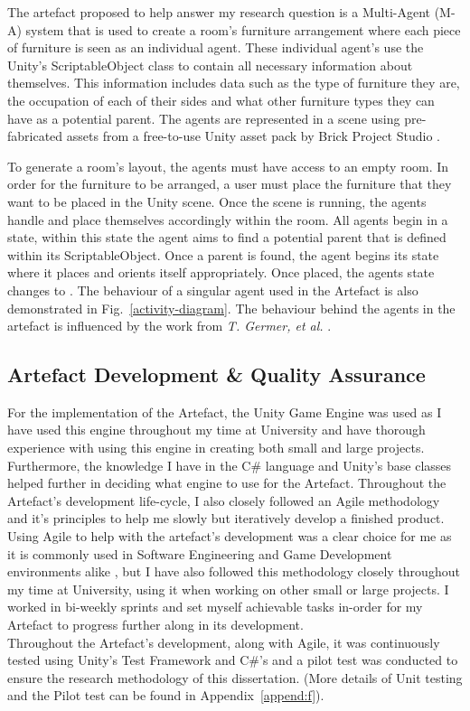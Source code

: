 The artefact proposed to help answer my research question is a Multi-Agent (M-A) system that is used to create a room's furniture arrangement where each piece of furniture is seen as an individual agent. These individual agent's use the Unity's \cite{unity} ScriptableObject class to contain all necessary information about themselves. This information includes data such as the type of furniture they are, the occupation of each of their sides and what other furniture types they can have as a potential parent. The agents are represented in a scene using pre-fabricated assets from a free-to-use Unity asset pack by Brick Project Studio \cite{brick-project}.

To generate a room's layout, the agents must have access to an empty room. In order for the furniture to be arranged, a user must place the furniture that they want to be placed in the Unity scene. Once the scene is running, the agents handle and place themselves accordingly within the room.
All agents begin in a  state, within this state the agent aims to find a potential parent that is defined within its ScriptableObject. Once a parent is found, the agent begins its  state where it places and orients itself appropriately. Once placed, the agents state changes to . The behaviour of a singular agent used in the Artefact is also demonstrated in Fig.~\ref{activity-diagram}.
The behaviour behind the agents in the artefact is influenced by the work from \textit{T. Germer, et al.} \cite{real-time-walkthroughs}.

\subsection{Artefact Development \& Quality Assurance} 
For the implementation of the Artefact, the Unity Game Engine \cite{unity} was used as I have used this engine throughout my time at University and have thorough experience with using this engine in creating both small and large projects. Furthermore, the knowledge I have in the C\# language and Unity's base classes helped further in deciding what engine to use for the Artefact.
Throughout the Artefact's development life-cycle, I also closely followed an Agile methodology and it's principles to help me slowly but iteratively develop a finished product. Using Agile to help with the artefact's development was a clear choice for me as it is commonly used in Software Engineering and Game Development environments alike \cite{game-dev-agile}, but I have also followed this methodology closely throughout my time at University, using it when working on other small or large projects. I worked in bi-weekly sprints and set myself achievable tasks in-order for my Artefact to progress further along in its development.
\\
Throughout the Artefact's development, along with Agile, it was continuously tested using Unity's Test Framework \cite{unit-unit-testing} and C\#'s \cite{nunit-framework} and a pilot test was conducted to ensure the research methodology of this dissertation. (More details of Unit testing and the Pilot test can be found in Appendix~\ref{append:f}).